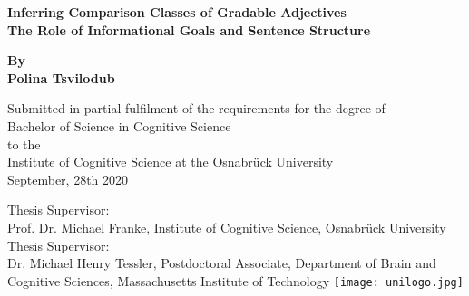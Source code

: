 \begin{titlepage}
	\begin{center}
		\vspace*{1cm}
		\Huge
		\textbf{Inferring Comparison Classes of Gradable Adjectives\\} 
		\vspace{0.5cm}
		\Large
		\textbf{The Role of Informational Goals and Sentence Structure}
		
		\vspace{1cm}
		
	
		\textbf{By \\ Polina Tsvilodub}
		
		\vspace{1cm}
		\small
		Submitted in partial fulfilment of the requirements for the degree of \\
		Bachelor of Science in Cognitive Science \\ to the \\
		Institute of Cognitive Science at the Osnabrück University\\
		September, 28th 2020
		
		\vspace{3cm}
		Thesis Supervisor:\\ Prof. Dr. Michael Franke, Institute of Cognitive Science, Osnabrück University \\
		\vspace{0.5cm}
		Thesis Supervisor:\\ Dr. Michael Henry Tessler, Postdoctoral Associate, Department of Brain and\\ Cognitive Sciences, Massachusetts Institute of Technology  
		\vfill 
		\texttt{[image: unilogo.jpg]}
		
	\end{center}
\end{titlepage}